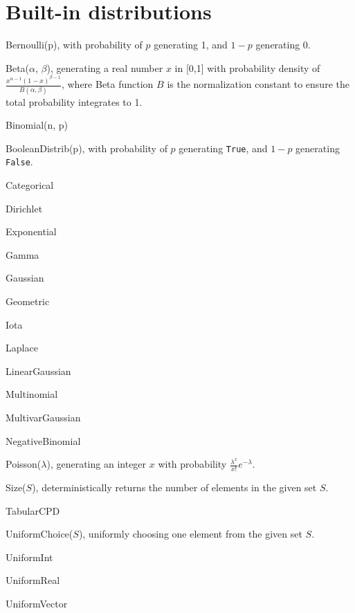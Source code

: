 \documentclass[12pt]{article}
\begin{document}
\section{Built-in distributions}\label{builtin-distribution-appendix}
\begin{itemize*}
\item Bernoulli(p), with probability of $p$ generating 1, and $1-p$ generating 0.
\item Beta($\alpha$, $\beta$), generating a real number $x$ in [0,1] with probability density of $\frac{x^{\alpha - 1} (1-x)^{\beta - 1}}{B(\alpha, \beta)}$, where Beta function $B$ is the normalization constant to ensure the total probability integrates to 1.
\item Binomial(n, p)  
\item BooleanDistrib(p), with probability of $p$ generating \verb|True|, and $1-p$ generating \verb|False|.
\item Categorical
\item Dirichlet
\item Exponential
\item Gamma
\item Gaussian
\item Geometric
\item Iota
\item Laplace
\item LinearGaussian
\item Multinomial
\item MultivarGaussian
\item NegativeBinomial
\item Poisson($\lambda$), generating an integer $x$ with probability $\frac{\lambda^x}{x!}e^{-\lambda}$.
\item Size($S$), deterministically returns the number of elements in the given set $S$.
\item TabularCPD
\item UniformChoice($S$), uniformly choosing one element from the given set $S$.
\item UniformInt
\item UniformReal
\item UniformVector
\end{itemize*}
\end{document}
